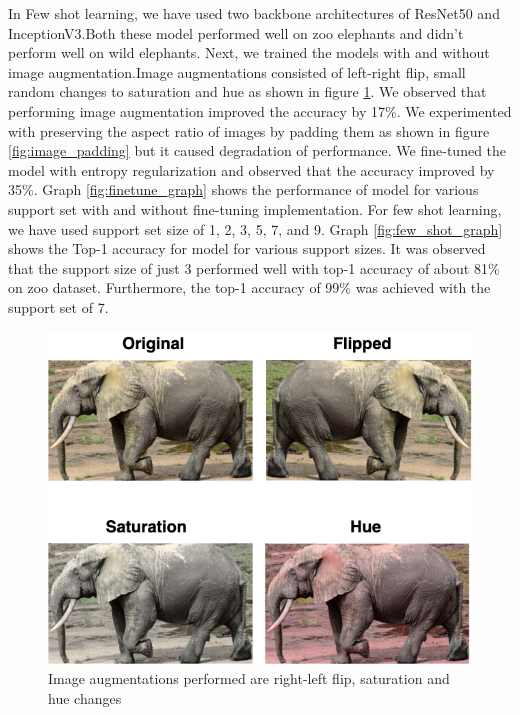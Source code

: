 \documentclass[10pt,twocolumn,letterpaper]{article}
\begin{document}
In Few shot learning, we have used two backbone architectures of ResNet50 and InceptionV3.Both these model performed well on zoo elephants and didn't perform well on wild elephants. 
Next, we trained the models with and without image augmentation.Image augmentations consisted of left-right flip, small random changes to saturation and hue as shown in figure \ref{fig:augmentation}. We observed that performing image augmentation improved the accuracy by 17\%. We experimented with preserving the aspect ratio of images by padding them as shown in figure \ref{fig:image_padding} but it caused degradation of performance. We fine-tuned the model with entropy regularization and observed that the accuracy improved by 35\%. Graph \ref{fig:finetune_graph} shows the performance of model for various support set with and without fine-tuning implementation. For few shot learning, we have used support set size of 1, 2, 3, 5, 7, and 9. Graph \ref{fig:few_shot_graph} shows the Top-1 accuracy for model for various support sizes. It was observed that the support size of just 3 performed well with top-1 accuracy of about 81\% on zoo dataset. Furthermore, the top-1 accuracy of 99\% was achieved with the support set of 7. 

\begin{figure}[t]
  \centering
  \includegraphics[scale=0.37]{augmentation}
   \caption{Image augmentations performed are right-left flip, saturation and hue changes}
   \label{fig:augmentation}
\end{figure}
\end{document}
